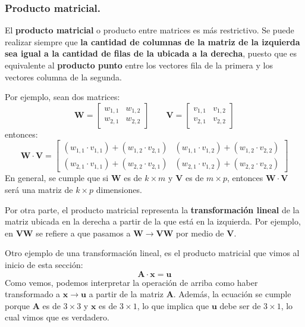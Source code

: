 \documentclass[12pt]{article}
\begin{document}
\subsubsection{Producto matricial.}

El \textbf{producto matricial} o producto entre matrices es más restrictivo. Se puede realizar siempre que \textbf{la cantidad de columnas de la matriz de la izquierda sea igual a la cantidad de filas de la ubicada a la derecha}, puesto que es equivalente al \textbf{producto punto} entre los vectores fila de la primera y los vectores columna de la segunda.

Por ejemplo, sean dos matrices:
\[
\mathbf{W} =
\begin{bmatrix}
w_{1, 1} & w_{1, 2} \\
w_{2, 1} & w_{2, 2}
\end{bmatrix}
\qquad
\mathbf{V} =
\begin{bmatrix}
v_{1, 1} & v_{1, 2} \\
v_{2, 1} & v_{2, 2}
\end{bmatrix}
\]
entonces:
\[
\mathbf{W} \cdot \mathbf{V} =
\begin{bmatrix}
(w_{1, 1} \cdot v_{1, 1}) + (w_{1, 2} \cdot v_{2, 1}) & (w_{1, 1} \cdot v_{1, 2}) + (w_{1, 2} \cdot v_{2, 2}) \\
(w_{2, 1} \cdot v_{1, 1}) + (w_{2, 2} \cdot v_{2, 1}) & (w_{2, 1} \cdot v_{1, 2}) + (w_{2, 2} \cdot v_{2, 2})
\end{bmatrix}
\]
En general, se cumple que si $\mathbf{W}$ es de $k \times m$ y $\mathbf{V}$ es de $m \times p$, entonces $\mathbf{W} \cdot \mathbf{V}$ será una matriz de $k \times p$ dimensiones.

Por otra parte, el producto matricial representa la \textbf{transformación lineal} de la matriz ubicada en la derecha a partir de la que está en la izquierda. Por ejemplo, en $\mathbf{V}\mathbf{W}$ se refiere a que pasamos a $\mathbf{W} \to \mathbf{V}\mathbf{W}$ por medio de $\mathbf{V}$.

Otro ejemplo de una transformación lineal, es el producto matricial que vimos al inicio de esta sección:
\[
  \mathbf{A} \cdot \mathbf{x} = \mathbf{u}
\]
Como vemos, podemos interpretar la operación de arriba como haber transformado a $\mathbf{x} \to \mathbf{u}$ a partir de la matriz $\mathbf{A}$. Además, la ecuación se cumple porque $\mathbf{A}$ es de $3 \times 3$ y $\mathbf{x}$ es de $3 \times 1$, lo que implica que $\mathbf{u}$ debe ser de $3 \times 1$, lo cual vimos que es verdadero.
\end{document}
